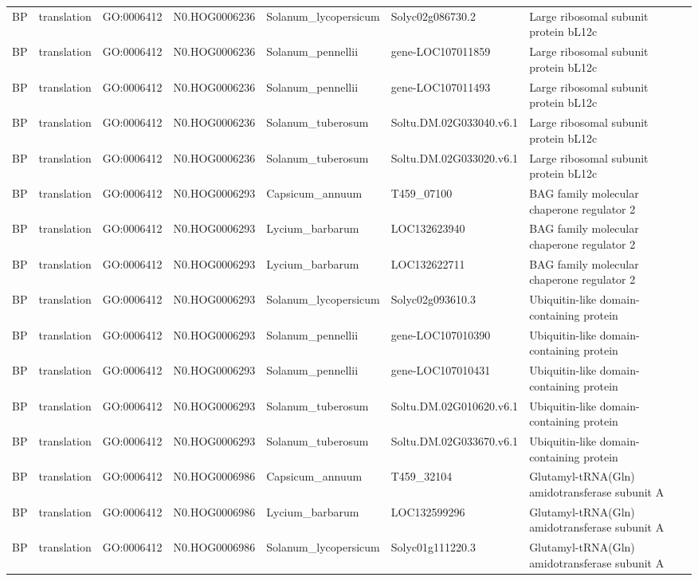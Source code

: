 \begin{table}
\begin{tabular}[t]{lllllll}
BP & translation & GO:0006412 & N0.HOG0006236 & Solanum\_lycopersicum & Solyc02g086730.2 & Large ribosomal subunit protein bL12c\\
BP & translation & GO:0006412 & N0.HOG0006236 & Solanum\_pennellii & gene-LOC107011859 & Large ribosomal subunit protein bL12c\\
BP & translation & GO:0006412 & N0.HOG0006236 & Solanum\_pennellii & gene-LOC107011493 & Large ribosomal subunit protein bL12c\\
BP & translation & GO:0006412 & N0.HOG0006236 & Solanum\_tuberosum & Soltu.DM.02G033040.v6.1 & Large ribosomal subunit protein bL12c\\
BP & translation & GO:0006412 & N0.HOG0006236 & Solanum\_tuberosum & Soltu.DM.02G033020.v6.1 & Large ribosomal subunit protein bL12c\\
BP & translation & GO:0006412 & N0.HOG0006293 & Capsicum\_annuum & T459\_07100 & BAG family molecular chaperone regulator 2\\
BP & translation & GO:0006412 & N0.HOG0006293 & Lycium\_barbarum & LOC132623940 & BAG family molecular chaperone regulator 2\\
BP & translation & GO:0006412 & N0.HOG0006293 & Lycium\_barbarum & LOC132622711 & BAG family molecular chaperone regulator 2\\
BP & translation & GO:0006412 & N0.HOG0006293 & Solanum\_lycopersicum & Solyc02g093610.3 & Ubiquitin-like domain-containing protein\\
BP & translation & GO:0006412 & N0.HOG0006293 & Solanum\_pennellii & gene-LOC107010390 & Ubiquitin-like domain-containing protein\\
BP & translation & GO:0006412 & N0.HOG0006293 & Solanum\_pennellii & gene-LOC107010431 & Ubiquitin-like domain-containing protein\\
BP & translation & GO:0006412 & N0.HOG0006293 & Solanum\_tuberosum & Soltu.DM.02G010620.v6.1 & Ubiquitin-like domain-containing protein\\
BP & translation & GO:0006412 & N0.HOG0006293 & Solanum\_tuberosum & Soltu.DM.02G033670.v6.1 & Ubiquitin-like domain-containing protein\\
BP & translation & GO:0006412 & N0.HOG0006986 & Capsicum\_annuum & T459\_32104 & Glutamyl-tRNA(Gln) amidotransferase subunit A\\
BP & translation & GO:0006412 & N0.HOG0006986 & Lycium\_barbarum & LOC132599296 & Glutamyl-tRNA(Gln) amidotransferase subunit A\\
BP & translation & GO:0006412 & N0.HOG0006986 & Solanum\_lycopersicum & Solyc01g111220.3 & Glutamyl-tRNA(Gln) amidotransferase subunit A\\

\end{tabular}
\end{table}
